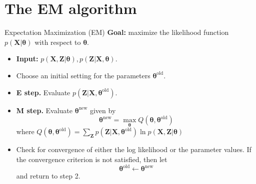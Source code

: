 \documentclass[10pt,mathserif]{beamer}
\begin{document}
\section{The EM algorithm}
\begin{frame}{Expectation Maximization (EM)}
\textbf{Goal:} maximize the likelihood function $p(\bm{X}|\bm{\theta})$ with respect to $\bm{\theta}$. 
\begin{itemize}
    \item \textbf{Input:} $p(\bm{X}, \bm{Z}|\bm{\theta}), p(\bm{Z}|\bm{X},\bm{\theta})$.
    \item Choose an initial setting for the parameters $\bm{\theta}^{\text{old}}$.
    \item \textbf{E step.} Evaluate $p(\bm{Z}|\bm{X}, \bm{\theta}^{\text{old}})$.
    \item \textbf{M step.} Evaluate $\bm{\theta}^{\text{new}}$ given by 
        \begin{equation*}
            \bm{\theta}^{\text{new}} = \max_{\bm{\theta}}Q(\bm{\theta}, \bm{\theta}^{\text{old}})
        \end{equation*}
    where $Q(\bm{\theta}, \bm{\theta}^{\text{old}}) = \sum_{\bm{Z}} p(\bm{Z}|\bm{X},\bm{\theta}^{\text{old}}) \ln p(\bm{X},\bm{Z}|\bm{\theta})$
    \item Check for convergence of either the log likelihood or the parameter values. If the convergence criterion is not satisfied, then let
    \begin{equation*}
        \bm{\theta}^{\text{old}} \leftarrow  \bm{\theta}^{\text{new}}
    \end{equation*}
    and return to step 2.
\end{itemize}
\end{frame}
\end{document}
